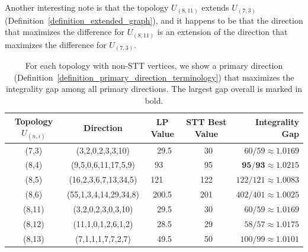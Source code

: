 
Another interesting note is that the topology $U_{(8,11)}$ extends $U_{(7,3)}$ (Definition~\ref{definition_extended_graph}), and it happens to be that the direction that maximizes the difference for $U_{(8,11)}$ is an extension of the direction that maximizes the difference for $U_{(7,3)}$.


\begin{table}[!ht]%
    \scriptsize
    \begin{center}
    \begin{tabular}{|c|c|c|c|r|}

    \hline
    Topology $U_{(n,i)}$ & Direction & LP Value & STT Best Value & Integrality Gap \\
    \hline
    (7,3) & (3,2,0,2,3,3,10) & \ 29.5 & \ 30 & $60/59 \approx 1.0169$ \\
    \hline
    (8,4) & (9,5,0,6,11,17,5,9) & \ 93 \ \ & \ 95 & $\mathbf{95/93 \approx 1.0215}$ \\
    \hline
    (8,5) & (16,2,3,6,7,13,34,5) & 121 \ \ & 122 & $122/121 \approx 1.0083$ \\
    \hline
    (8,6) & (55,1,3,4,14,29,34,8) & 200.5 & 201 & $402/401 \approx 1.0025$ \\
    \hline
    (8,11) & (3,2,0,2,3,0,3,10) & \ 29.5 & \ 30 & $60/59 \approx 1.0169$ \\
    \hline
    (8,12) & (11,1,0,1,2,6,1,2) & \ 28.5 & \ 29 & $58/57 \approx 1.0175$ \\
    \hline
    (8,13) & (7,1,1,1,7,7,2,7) & \ 49.5 & \ 50 & $100/99 \approx 1.0101$ \\
    \hline
    \end{tabular}
    \end{center}
    
    \caption{\footnotesize{For each topology with non-STT vertices, we show a primary direction (Definition~\ref{definition_primary_direction_terminology}) that maximizes the integrality gap among all primary directions. The largest gap overall is marked in bold.}}
    \label{table_integrality_gaps}
\end{table}


